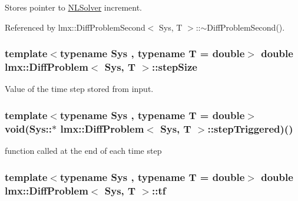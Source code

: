 Stores pointer to \hyperlink{classlmx_1_1NLSolver}{N\-L\-Solver} increment. 



Referenced by lmx\-::\-Diff\-Problem\-Second$<$ Sys, T $>$\-::$\sim$\-Diff\-Problem\-Second().

\hypertarget{classlmx_1_1DiffProblem_a618e5cd5bfc0fcdf581688a19f6d8f8f}{
\subsubsection[{step\-Size}]{\setlength{\rightskip}{0pt plus 5cm}template$<$typename Sys , typename T  = double$>$ double {\bf lmx\-::\-Diff\-Problem}$<$ Sys, T $>$\-::step\-Size\hspace{0.3cm}{\ttfamily [protected]}}}\label{classlmx_1_1DiffProblem_a618e5cd5bfc0fcdf581688a19f6d8f8f}


Value of the time step stored from input. 

\hypertarget{classlmx_1_1DiffProblem_a57aca09c09bd4d8ce9913bf07b88f135}{
\subsubsection[{step\-Triggered}]{\setlength{\rightskip}{0pt plus 5cm}template$<$typename Sys , typename T  = double$>$ void(Sys\-::$\ast$  {\bf lmx\-::\-Diff\-Problem}$<$ Sys, T $>$\-::step\-Triggered)()\hspace{0.3cm}{\ttfamily [protected]}}}\label{classlmx_1_1DiffProblem_a57aca09c09bd4d8ce9913bf07b88f135}


function called at the end of each time step 

\hypertarget{classlmx_1_1DiffProblem_a6b58fb60128a6c764f641d8c3fa27bf2}{
\subsubsection[{tf}]{\setlength{\rightskip}{0pt plus 5cm}template$<$typename Sys , typename T  = double$>$ double {\bf lmx\-::\-Diff\-Problem}$<$ Sys, T $>$\-::tf\hspace{0.3cm}{\ttfamily [protected]}}}\label{classlmx_1_1DiffProblem_a6b58fb60128a6c764f641d8c3fa27bf2}


